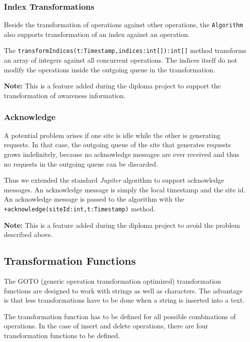 \subsubsection{Index Transformations}
Beside the transformation of operations against other operations, the
\texttt{Algorithm} also supports transformation of an index against an
operation.

The \texttt{transformIndices(t:Timestamp,indices:int[]):int[]} method transforms
an array of integers against all concurrent operations. The indices itself
do not modify the operations inside the outgoing queue in the transformation.

\textbf{Note:} This is a feature added during the diploma project to support
the transformation of awareness information.

\subsubsection{Acknowledge}
A potential problem arises if one site is idle while the other is generating
requests. In that case, the outgoing queue of the site that generates requests
grows indefinitely, because no acknowledge messages are ever received and thus
no requests in the outgoing queue can be discarded.

Thus we extended the standard \emph{Jupiter} algorithm to support acknowledge
messages. An acknowledge message is simply the local timestamp and the site
id. An acknowledge message is passed to the algorithm with the
\texttt{+acknowledge(siteId:int,t:Timestamp)} method.

\textbf{Note:} This is a feature added during the diploma project to
avoid the problem described above.




\subsection{Transformation Functions}
The GOTO (generic operation transformation optimized) transformation functions 
are designed to work with strings as well as characters. The advantage is that 
less transformations have to be done when a string is inserted into a text. 

The transformation function has to be defined for all possible combinations
of operations. In the case of insert and delete operations, there are four
transformation functions to be defined.

